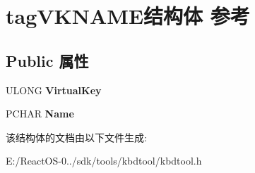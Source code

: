 \hypertarget{structtag_v_k_n_a_m_e}{}\section{tag\+V\+K\+N\+A\+M\+E结构体 参考}
\label{structtag_v_k_n_a_m_e}
\subsection*{Public 属性}
\begin{DoxyCompactItemize}
\item 
\mbox{\label{structtag_v_k_n_a_m_e_ab46efb9536e83f75978606a3145adfd6}} 
U\+L\+O\+NG {\bfseries Virtual\+Key}
\item 
\mbox{\label{structtag_v_k_n_a_m_e_a554c2b7987b39018e2c90d855e294794}} 
P\+C\+H\+AR {\bfseries Name}
\end{DoxyCompactItemize}


该结构体的文档由以下文件生成\+:\begin{DoxyCompactItemize}
\item 
E\+:/\+React\+O\+S-\/0../sdk/tools/kbdtool/kbdtool.\+h\end{DoxyCompactItemize}
